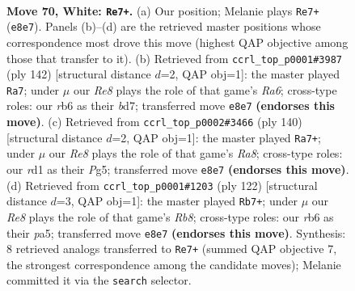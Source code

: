 \documentclass[11pt]{article}
\begin{document}
\clearpage

\begin{figure}[p]\centering
\begin{subfigure}{0.46\textwidth}\centering
\resizebox{\linewidth}{!}{%
\newchessgame
\chessboard[
  setfen={4R3/6k1/1r6/8/5K2/8/7P/3r4 w - - 7 70},
  showmover=false,
  pgfstyle=straightmove, color=movearrow, markmove={e8-e7}
]}
\caption{}
\end{subfigure}\hfill
\begin{subfigure}{0.46\textwidth}\centering
\resizebox{\linewidth}{!}{%
\newchessgame
\chessboard[
  setfen={8/3b4/R7/4k2P/8/8/5K2/2r5 w - - 2 72},
  showmover=false,
  pgfstyle=straightmove, color=movearrow, markmove={a6-a7}
]}
\caption{}
\end{subfigure}
\\[4pt]
\begin{subfigure}{0.46\textwidth}\centering
\resizebox{\linewidth}{!}{%
\newchessgame
\chessboard[
  setfen={R7/4k3/8/6Pp/8/1r6/8/4K3 w - - 9 71},
  showmover=false,
  pgfstyle=straightmove, color=movearrow, markmove={a8-a7}
]}
\caption{}
\end{subfigure}\hfill
\begin{subfigure}{0.46\textwidth}\centering
\resizebox{\linewidth}{!}{%
\newchessgame
\chessboard[
  setfen={1R6/6k1/8/p7/6P1/3r4/8/4K3 w - - 7 62},
  showmover=false,
  pgfstyle=straightmove, color=movearrow, markmove={b8-b7}
]}
\caption{}
\end{subfigure}
\caption{\textbf{Move 70, White: \texttt{Re7+}.} (a) Our position; Melanie plays \texttt{Re7+} (\texttt{e8e7}). Panels (b)--(d) are the retrieved master positions whose correspondence most drove this move (highest QAP objective among those that transfer to it). (b) Retrieved from \texttt{ccrl\_top\_p0001\#3987} (ply 142) [structural distance $d$=2, QAP obj=1]: the master played \texttt{Ra7}; under $\mu$ our \emph{Re8} plays the role of that game's \emph{Ra6}; cross-type roles: our \emph{r}b6 as their \emph{b}d7; transferred move \texttt{e8e7} \textbf{(endorses this move)}. (c) Retrieved from \texttt{ccrl\_top\_p0002\#3466} (ply 140) [structural distance $d$=2, QAP obj=1]: the master played \texttt{Ra7+}; under $\mu$ our \emph{Re8} plays the role of that game's \emph{Ra8}; cross-type roles: our \emph{r}d1 as their \emph{P}g5; transferred move \texttt{e8e7} \textbf{(endorses this move)}. (d) Retrieved from \texttt{ccrl\_top\_p0001\#1203} (ply 122) [structural distance $d$=3, QAP obj=1]: the master played \texttt{Rb7+}; under $\mu$ our \emph{Re8} plays the role of that game's \emph{Rb8}; cross-type roles: our \emph{r}b6 as their \emph{p}a5; transferred move \texttt{e8e7} \textbf{(endorses this move)}. Synthesis: 8 retrieved analogs transferred to \texttt{Re7+} (summed QAP objective 7, the strongest correspondence among the candidate moves); Melanie committed it via the \texttt{search} selector.}
\label{fig:thought-m138}
\end{figure}
\end{document}
